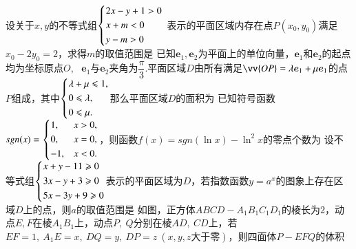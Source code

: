 \documentclass{BHCexam}
\begin{document}
\begin{questions}
\qs 设关于$ x,y $的不等式组$ \begin{dcases}
2x-y+1>0\\x+m<0\\y-m>0
\end{dcases} $
表示的平面区域内存在点$ P(x_0,y_0) $满足$ x_0-2y_0=2 $，求得$ m $的取值范围是\xx
{}
\qs 已知$ \bm{e}_1 ,\bm{e}_2$为平面上的单位向量，$ \bm{e}_1 $和$ \bm{e}_2 $的起点均为坐标原点$ O $,~  $\bm{e}_1$与$\bm{e}_2$夹角为$ \dfrac{\pi}{3} .$平面区域$ D $由所有满足$ \vv{OP}=\lambda \bm{e}_1+\mu \bm{e}_1 $的点$ P $组成，其中$ \begin{dcases}
\lambda+\mu\le1,\\
0\le\lambda,\\
0\le\mu.
\end{dcases} $那么平面区域$ D $的面积为\xx
{}
\qs 已知符号函数$ sgn(x)=\begin{dcases}
1,&x>0,\\
0,&x=0,\\
-1,&x<0.
\end{dcases} $，则函数$f(x)=sgn(\ln x)-\ln^2x$的零点个数为\xx
{}
\qs 设不等式组$ \begin{dcases}
x+y-11\ge 0\\3x-y+3\ge 0\\5x-3y+9\ge 0
\end{dcases} $表示的平面区域为$ D $，若指数函数$ y=a^x $的图象上存在区域$ D $上的点，则$ a $的取值范围是\xx
\onech{$\left(1,3\right]$}{$\left[2,3\right]$}{$\left(1,2\right]$}{$\left[3,+\infty\right)$}
\qs 如图，正方体$ ABCD-A_1B_1C_1D_1 $的棱长为$2$，动点$ E,F $在棱$ A_1B_1 $上，动点$ P,~Q $分别在棱$ AD,~CD $上，若$ EF=1,~A_1E=x,~DQ=y,~DP=z~(x,y,z\text{大于零} )$，则四面体$P-EFQ  $的体积
\xx
{}
\vspace{-9em}
\\\mbox{\hspace{1pt}}\hfill
{}
\end{questions}
\end{document}
